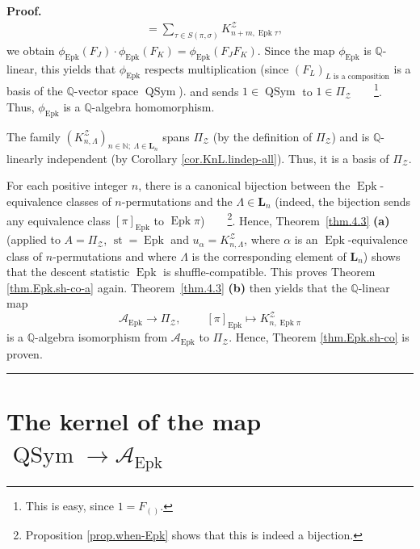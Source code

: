 \documentclass[numbers=enddot,12pt,final,onecolumn,notitlepage]{scrartcl}%
\theoremstyle{definition}
\newenvironment{proof}[1][Proof]{\noindent\textbf{#1.} }{\ \rule{0.5em}{0.5em}}
\newenvironment{verlong}{}{}
\newcommand{\NN}{\mathbb{N}}
\let\sumnonlimits\sum
\renewcommand{\sum}{\sumnonlimits\limits}
\begin{document}
\begin{verlong}
\begin{proof}
{\begin{align*}
&  =\sum_{\tau\in S\left(  \pi,\sigma\right)  }K_{n+m,\operatorname{Epk}\tau
}^{\mathcal{Z}},
\end{align*}
we obtain $\phi_{\operatorname{Epk}}\left(  F_{J}\right)  \cdot
\phi_{\operatorname{Epk}}\left(  F_{K}\right)  =\phi_{\operatorname{Epk}}
\left(  F_{J}F_{K}\right)  $. Since the map $\phi_{\operatorname{Epk}}$ is
$\mathbb{Q}$-linear, this yields that $\phi_{\operatorname{Epk}}$ respects
multiplication (since $\left(  F_{L}\right)  _{L\text{ is a composition}}$ is
a basis of the $\mathbb{Q}$-vector space $\operatorname*{QSym}$).} and sends
$1\in\operatorname*{QSym}$ to $1\in\Pi_{\mathcal{Z}}$\ \ \ \ \footnote{This is
easy, since $1=F_{\left(  {}\right)  }$.}. Thus, $\phi_{\operatorname{Epk}}$
is a $\mathbb{Q}$-algebra homomorphism.

The family $\left(  K_{n,\Lambda}^{\mathcal{Z}}\right) %
_{n \in \NN;\  \Lambda \in \mathbf{L}_n}$ spans $\Pi_{\mathcal{Z}}$ (by the
definition of $\Pi_{\mathcal{Z}}$) and is $\mathbb{Q}$-linearly independent
(by Corollary \ref{cor.KnL.lindep-all}). Thus, it is a basis of $\Pi
_{\mathcal{Z}}$.

For each positive integer $n$, there is a canonical bijection between the
$\operatorname{Epk}$-equivalence classes of $n$-permutations and the
$\Lambda \in \mathbf{L}_n$ (indeed, the bijection sends
any equivalence class $\left[  \pi\right]  _{\operatorname{Epk}}$ to
$\operatorname{Epk}\pi$)\ \ \ \ \footnote{Proposition \ref{prop.when-Epk}
shows that this is indeed a bijection.}. Hence, Theorem~\ref{thm.4.3}
\textbf{(a)} (applied to $A=\Pi_{\mathcal{Z}}$, $\operatorname{st}
=\operatorname{Epk}$ and $u_{\alpha}=K_{n,\Lambda}^{\mathcal{Z}}$, where
$\alpha$ is an $\operatorname{Epk}$-equivalence class of $n$-permutations and
where $\Lambda$ is the corresponding element of $\mathbf{L}_n$)
shows that the descent statistic $\operatorname{Epk}$ is
shuffle-compatible. This proves Theorem \ref{thm.Epk.sh-co-a} again.
Theorem~\ref{thm.4.3} \textbf{(b)} then yields that the $\mathbb{Q}$-linear
map%
\[
\mathcal{A}_{\operatorname{Epk}}\rightarrow\Pi_{\mathcal{Z}}%
,\ \ \ \ \ \ \ \ \ \ \left[  \pi\right]  _{\operatorname{Epk}}\mapsto
K_{n,\operatorname{Epk}\pi}^{\mathcal{Z}}%
\]
is a $\mathbb{Q}$-algebra isomorphism from $\mathcal{A}_{\operatorname{Epk}}$
to $\Pi_{\mathcal{Z}}$. Hence, Theorem \ref{thm.Epk.sh-co} is proven.
\end{proof}
\end{verlong}

\section{\label{sect.kernel}The kernel of the map $\operatorname*{QSym}%
\rightarrow\mathcal{A}_{\operatorname{Epk}}$}
\end{document}
